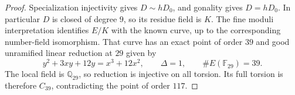 \begin{proof}
Specialization injectivity gives $D\sim hD_0$, and gonality gives $D=hD_0$.
In particular $D$ is closed of degree $9$, so its residue field is $K$.
The fine moduli interpretation identifies $E/K$ with the known curve, up to the corresponding number-field isomorphism.
That curve has an exact point of order $39$ and good unramified linear reduction at $29$ given by
\[
 y^2+3xy+12y=x^3+12x^2,
 \qquad \Delta=1,\qquad \#E(\mathbb F_{29})=39.
\]
The local field is $\mathbb Q_{29}$, so reduction is injective on all torsion.
Its full torsion is therefore $C_{39}$, contradicting the point of order $117$.
\end{proof}
